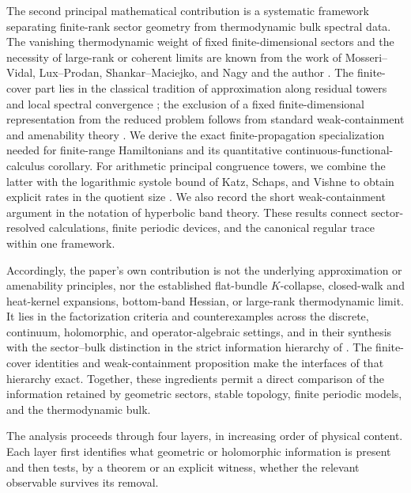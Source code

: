 \documentclass[11pt]{article}
\theoremstyle{definition}
\theoremstyle{remark}
\begin{document}
The second principal mathematical contribution is a systematic framework
separating finite-rank sector geometry from thermodynamic bulk spectral data.
The vanishing thermodynamic weight of fixed finite-dimensional sectors and
the necessity of large-rank or coherent limits are known from the work of
Mosseri--Vidal, Lux--Prodan, Shankar--Maciejko, and Nagy and the author
\cite{MosseriVidal2023,LuxProdanCayley2024,LuxProdan2023,
ShankarMaciejko2024,NagyRayan2024}.  The finite-cover part lies in the
classical tradition of approximation along residual towers and local spectral
convergence \cite{Luck1994,AbertThomVirag2014}; the exclusion of a fixed
finite-dimensional representation from the reduced problem follows from
standard weak-containment and amenability theory
\cite{Hulanicki1964}.  We derive the exact finite-propagation specialization
needed for finite-range Hamiltonians and its quantitative
continuous-functional-calculus corollary.  For arithmetic principal
congruence towers, we combine the latter with the logarithmic systole bound of
Katz, Schaps, and Vishne to obtain explicit rates in the quotient size
\cite{KatzSchapsVishne2007}.  We also record the short weak-containment
argument in the notation of hyperbolic band theory.  These results connect
sector-resolved calculations, finite periodic devices, and the canonical
regular trace within one framework.

Accordingly, the paper's own contribution is not the underlying approximation
or amenability principles, nor the established flat-bundle \(K\)-collapse,
closed-walk and heat-kernel expansions, bottom-band Hessian, or large-rank
thermodynamic limit.  It lies in the factorization criteria and
counterexamples across the discrete, continuum, holomorphic, and
operator-algebraic settings, and in their synthesis with the sector--bulk
distinction in the strict information hierarchy of
.  The finite-cover identities and
weak-containment proposition make the interfaces of that hierarchy exact.
Together, these ingredients permit a direct comparison of the information
retained by geometric sectors, stable topology, finite periodic models, and
the thermodynamic bulk.

The analysis proceeds through four layers, in increasing order of
physical content.  Each layer first identifies what geometric or holomorphic
information is present and then tests, by a theorem or an explicit witness,
whether the relevant observable survives its removal.
\end{document}
